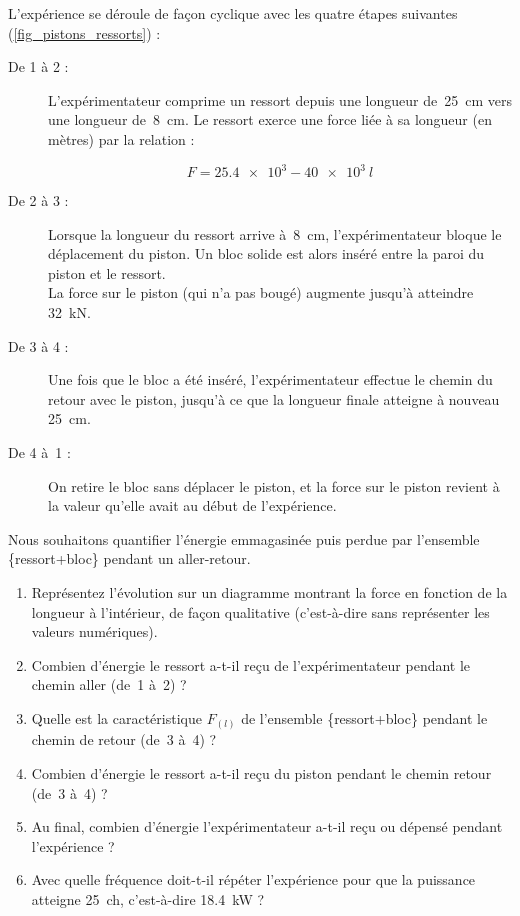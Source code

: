 	L’expérience se déroule de façon cyclique avec les quatre étapes suivantes (\cref{fig_pistons_ressorts}) :
	
	\begin{description}
		\item[De 1 à 2 :] L’expérimentateur comprime un ressort depuis une longueur de~\SI{25}{\centi\metre} vers une longueur de~\SI{8}{\centi\metre}.
		Le ressort exerce une force liée à sa longueur (en mètres) par la relation :
		
		\begin{equation}
			F = \num{25,4e3} - \num{40e3} \ l
		\end{equation}
		

		\item[De 2 à 3 :] Lorsque la longueur du ressort arrive à~\SI{8}{\centi\metre}, l’expérimentateur bloque le déplacement du piston. Un bloc solide est alors inséré entre la paroi du piston et le ressort. \\
		La force sur le piston (qui n’a pas bougé) augmente jusqu’à atteindre \SI{32}{\kilo\newton}.
		
		\item[De 3 à 4 :] Une fois que le bloc a été inséré, l’expérimentateur effectue le chemin du retour avec le piston, jusqu’à ce que la longueur finale atteigne à nouveau \SI{25}{\centi\metre}.
		
		\item[De 4 à~1 :] On retire le bloc sans déplacer le piston, et la force sur le piston revient à la valeur qu’elle avait au début de l’expérience.
	\end{description}
	
	Nous souhaitons quantifier l’énergie emmagasinée puis perdue par l’ensemble \{ressort+bloc\} pendant un aller-retour.
	
	\begin{enumerate}
		\item Représentez l’évolution sur un diagramme montrant la force en fonction de la longueur à l’intérieur, de façon qualitative (c’est-à-dire sans représenter les valeurs numériques).
		\item Combien d’énergie le ressort a-t-il reçu de l’expérimentateur pendant le chemin aller (de~1 à~2) ?
		\item Quelle est la caractéristique $F_{(l)}$ de l’ensemble \{ressort+bloc\} pendant le chemin de retour (de~3 à~4) ?
		\item Combien d’énergie le ressort a-t-il reçu du piston pendant le chemin retour (de~3 à~4) ?
		\item Au final, combien d’énergie l’expérimentateur a-t-il reçu ou dépensé pendant l’expé\-rience ?
		\item Avec quelle fréquence doit-t-il répéter l’expérience pour que la puissance atteigne \SI{25}{ch}, c’est-à-dire \SI{18,4}{\kilo\watt} ?
	\end{enumerate}


